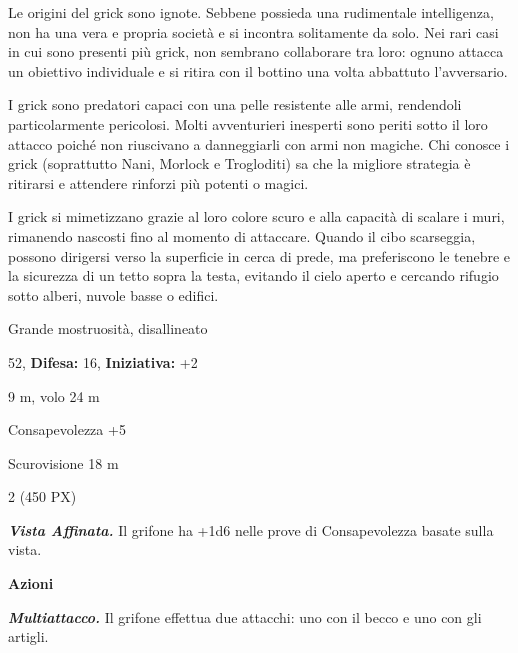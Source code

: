\begin{multicols}{2}
{Le origini del grick sono ignote. Sebbene possieda una rudimentale intelligenza, non ha una vera e propria società e si incontra solitamente da solo. Nei rari casi in cui sono presenti più grick, non sembrano collaborare tra loro: ognuno attacca un obiettivo individuale e si ritira con il bottino una volta abbattuto l'avversario.

I grick sono predatori capaci con una pelle resistente alle armi, rendendoli particolarmente pericolosi. Molti avventurieri inesperti sono periti sotto il loro attacco poiché non riuscivano a danneggiarli con armi non magiche. Chi conosce i grick (soprattutto Nani, Morlock e Trogloditi) sa che la migliore strategia è ritirarsi e attendere rinforzi più potenti o magici.

I grick si mimetizzano grazie al loro colore scuro e alla capacità di scalare i muri, rimanendo nascosti fino al momento di attaccare. Quando il cibo scarseggia, possono dirigersi verso la superficie in cerca di prede, ma preferiscono le tenebre e la sicurezza di un tetto sopra la testa, evitando il cielo aperto e cercando rifugio sotto alberi, nuvole basse o edifici.

\noindent
\begin{description}[noitemsep, topsep=0pt, parsep=0pt, partopsep=0pt, leftmargin=0cm, labelwidth=2.2cm]
	\item[\textbf{Taglia/Tipo:}] Grande mostruosità, disallineato
	\item[\textbf{Caratt.:}] 
	\item[\textbf{Punti Ferita:}] 52,  \textbf{Difesa:} 16,  \textbf{Iniziativa:} +2
	\item[\textbf{Movimento:}] 9 m, volo 24 m
	\item[\textbf{Tiri Salvez.:}] 
	\item[\textbf{Comp.:}] Consapevolezza +5
	\item[\textbf{Sensi:}] Scurovisione 18 m
	\item[\textbf{Sfida:}] 2 (450 PX)\smallskip
\end{description}

\emph{\textbf{Vista Affinata.}} Il grifone ha +1d6 nelle prove di Consapevolezza basate sulla vista.

\textbf{Azioni}

\emph{\textbf{Multiattacco.}} Il grifone effettua due attacchi: uno con il becco e uno con gli artigli.

}
\end{multicols}

